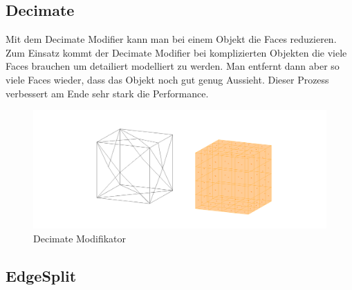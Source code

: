 \subsection{Decimate}
Mit dem Decimate Modifier \citep{blender:decimate_modifier} kann man bei einem Objekt die Faces reduzieren. Zum Einsatz kommt der
Decimate Modifier bei komplizierten Objekten die viele Faces brauchen um detailiert modelliert zu werden. Man entfernt dann aber so viele Faces wieder, dass das Objekt
noch gut genug Aussieht. Dieser Prozess verbessert am Ende sehr stark die Performance.
\begin{figure}[h]
    \centering
    \includegraphics[width=.8\textwidth]{images/Modifikatoren-Decimate.png}
    \caption{Decimate Modifikator}
    \label{modifikatoren:image6}
\end{figure}

\subsection{EdgeSplit}

